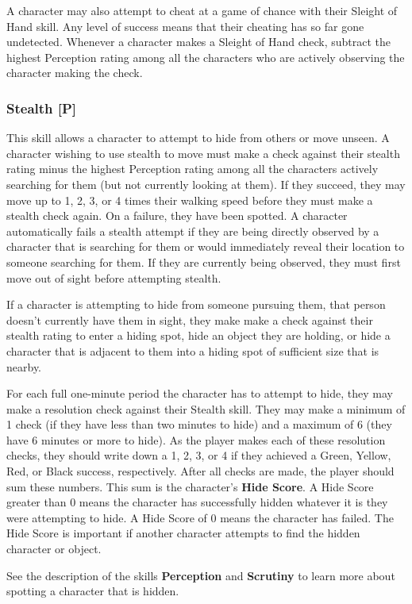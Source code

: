 \documentclass[oneside]{book}
\begin{document}
\begin{multicols}{2}
A character may also attempt to cheat at a game of chance with their Sleight of Hand skill. Any level of success means that their cheating has so far gone undetected. 
Whenever a character makes a Sleight of Hand check, subtract the highest Perception rating among all the characters who are actively observing the character making the check. 

\subsubsection{Stealth [P]}
This skill allows a character to attempt to hide from others or move unseen. A character wishing to use stealth to move must make a check against their stealth rating minus the highest Perception rating among all the characters actively searching for them (but not currently looking at them). If they succeed, they may move up to 1, 2, 3, or 4 times their walking speed before they must make a stealth check again. On a failure, they have been spotted. A character automatically fails a stealth attempt if they are being directly observed by a character that is searching for them or would immediately reveal their location to someone searching for them. If they are currently being observed, they must first move out of sight before attempting stealth. 

If a character is attempting to hide from someone pursuing them, that person doesn't currently have them in sight, they make make a check against their stealth rating to enter a hiding spot, hide an object they are holding, or hide a character that is adjacent to them into a hiding spot of sufficient size that is nearby.

 For each full one-minute period the character has to attempt to hide, they may make a resolution check against their Stealth skill. They may make a minimum of 1 check (if they have less than two minutes to hide) and a maximum of 6 (they have 6 minutes or more to hide). As the player makes each of these resolution checks, they should write down a 1, 2, 3, or 4 if they achieved a Green, Yellow, Red, or Black success, respectively. After all checks are made, the player should sum these numbers. This sum is the character's \textbf{Hide Score}. A Hide Score greater than 0 means the character has successfully hidden whatever it is they were attempting to hide. A Hide Score of 0 means the character has failed. The Hide Score is important if another character attempts to find the hidden character or object.

See the description of the skills \textbf{Perception} and \textbf{Scrutiny} to learn more about spotting a character that is hidden. 


\end{multicols}
\end{document}
